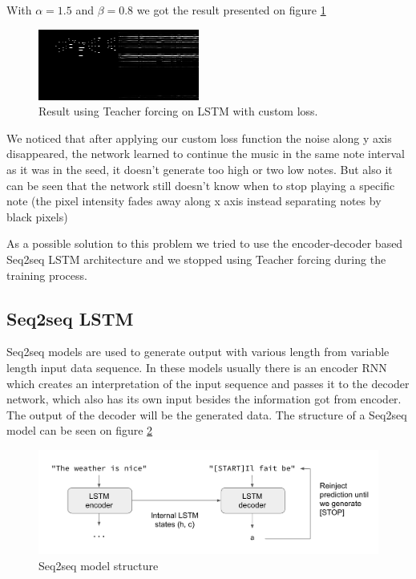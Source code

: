 \documentclass{article}
\begin{document}
With $\alpha = 1.5$ and $\beta = 0.8$ we got the result presented on figure \ref{fig:LSTMresult-2}

\begin{figure}[!htb]
	\centering
	\includegraphics[width=0.8\linewidth]{LSTMresult2.png}
	\caption{Result using Teacher forcing on LSTM with custom loss.}
	\label{fig:LSTMresult-2}
\end{figure}

We noticed that after applying our custom loss function the noise along y axis disappeared, the network learned to continue the music in the same note interval as it was in the seed, it doesn't generate too high or two low notes. But also it can be seen that the network still doesn't know when to stop playing a specific note (the pixel intensity fades away along x axis instead separating notes by black pixels) 

As a possible solution to this problem we tried to use the encoder-decoder based Seq2seq LSTM architecture and we stopped using Teacher forcing during the training process. 

\subsection{Seq2seq LSTM}

Seq2seq models are used to generate output with various length from variable length input data sequence. In these models usually there is an encoder RNN which creates an interpretation of the input sequence and passes it to the decoder network, which also has its own input besides the information got from encoder. The output of the decoder will be the generated data. The structure of a Seq2seq model can be seen on figure \ref{fig:seq2seqmodel}

\begin{figure}[!htb]
	\centering
	\includegraphics[width=0.8\linewidth]{seq2seqmodel.png}
	\caption{Seq2seq model structure}
	\label{fig:seq2seqmodel}
\end{figure}
\end{document}

